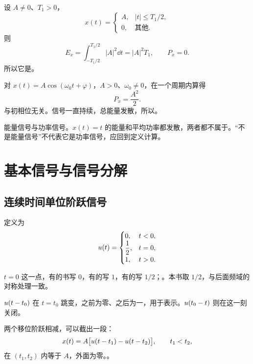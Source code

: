 \begin{example}[有限时宽脉冲的能量]
  设 $A\ne0$、$T_1>0$，
  \[
    x(t)=
    \begin{cases}
      A,&|t|\leq T_1/2,\\
      0,&\text{其他}.
    \end{cases}
  \]
  则
  \[
    E_x=\int_{-T_1/2}^{T_1/2}|A|^2\dd t=|A|^2T_1,
    \qquad P_x=0.
  \]
  所以它是。
\end{example}

\begin{example}[正弦信号的平均功率]
  对 $x(t)=A\cos(\omega_0t+\varphi)$，$A>0$、$\omega_0\ne0$，在一个周期内算得
  \[
    P_x=\frac{A^2}{2}.
  \]
  与初相位无关。信号一直持续，总能量发散，所以。
\end{example}

能量信号与功率信号。$x(t)=t$ 的能量和平均功率都发散，两者都不属于。“不是能量信号”不代表它是功率信号，应回到定义计算。

\section{基本信号与信号分解}
\label{sec:elementary-signals}

\subsection{连续时间单位阶跃信号}

\begin{definition}[单位阶跃信号]
  \label{def:ct-unit-step}
  定义为
  \begin{equation}
    u(t)=
    \begin{cases}
      0,&t<0,\\
      \dfrac{1}{2},&t=0,\\
      1,&t>0.
    \end{cases}
    \label{eq:ct-unit-step}
  \end{equation}
\end{definition}

$t=0$ 这一点，有的书写 $0$，有的写 $1$，有的写 $1/2$；。本书取 $1/2$，与后面频域的对称处理一致。

$u(t-t_0)$ 在 $t=t_0$ 跳变，之前为零、之后为一，用于表示。$u(t_0-t)$ 则在这一刻关闭。

两个移位阶跃相减，可以截出一段：
\begin{equation}
  x(t)=A\bigl[u(t-t_1)-u(t-t_2)\bigr],
  \qquad t_1<t_2,
  \label{eq:rectangular-pulse-with-steps}
\end{equation}
在 $(t_1,t_2)$ 内等于 $A$，外面为零。。

